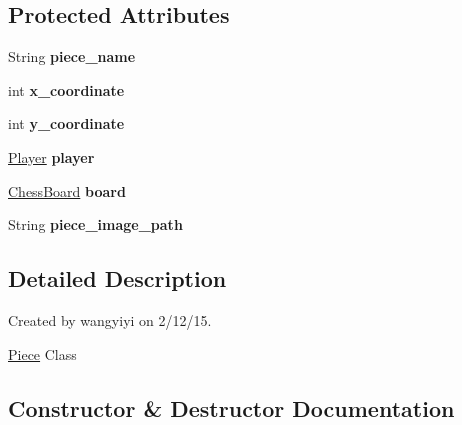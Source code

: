 \subsection*{Protected Attributes}
\begin{DoxyCompactItemize}
\item 
\hypertarget{classpiece_1_1_piece_a670862c335c65ea88dce5269c9ce9bfb}{}String {\bfseries piece\+\_\+name}\label{classpiece_1_1_piece_a670862c335c65ea88dce5269c9ce9bfb}

\item 
\hypertarget{classpiece_1_1_piece_aedff76d42dc52074d88776c447d75aac}{}int {\bfseries x\+\_\+coordinate}\label{classpiece_1_1_piece_aedff76d42dc52074d88776c447d75aac}

\item 
\hypertarget{classpiece_1_1_piece_a5eb75915739d2aac27293242b4b062c3}{}int {\bfseries y\+\_\+coordinate}\label{classpiece_1_1_piece_a5eb75915739d2aac27293242b4b062c3}

\item 
\hypertarget{classpiece_1_1_piece_a7aef88c8a61c1cd4a469aa15393ae1c2}{}\hyperlink{enumchess_1_1_player}{Player} {\bfseries player}\label{classpiece_1_1_piece_a7aef88c8a61c1cd4a469aa15393ae1c2}

\item 
\hypertarget{classpiece_1_1_piece_a89bee87e940fc2718964d92e842517d7}{}\hyperlink{classchess_1_1_chess_board}{Chess\+Board} {\bfseries board}\label{classpiece_1_1_piece_a89bee87e940fc2718964d92e842517d7}

\item 
\hypertarget{classpiece_1_1_piece_af66e4d5f1b6324a93d43f7778be2da36}{}String {\bfseries piece\+\_\+image\+\_\+path}\label{classpiece_1_1_piece_af66e4d5f1b6324a93d43f7778be2da36}

\end{DoxyCompactItemize}


\subsection{Detailed Description}
Created by wangyiyi on 2/12/15.

\hyperlink{classpiece_1_1_piece}{Piece} Class 

\subsection{Constructor \& Destructor Documentation}
\hypertarget{classpiece_1_1_piece_a2a951c56b9c86a93fab817ddb7da4413}{}
